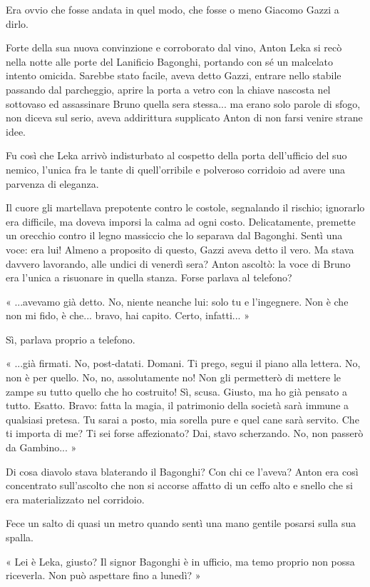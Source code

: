 Era ovvio che fosse andata in quel modo, che fosse o meno Giacomo Gazzi a dirlo.

Forte della sua nuova convinzione e corroborato dal vino, Anton Leka si recò nella notte alle porte del Lanificio Bagonghi, portando con sé un malcelato intento omicida. Sarebbe stato facile, aveva detto Gazzi, entrare nello stabile passando dal parcheggio, aprire la porta a vetro con la chiave nascosta nel sottovaso ed assassinare Bruno quella sera stessa... ma erano solo parole di sfogo, non diceva sul serio, aveva addirittura supplicato Anton di non farsi venire strane idee.

Fu così che Leka arrivò indisturbato al cospetto della porta dell'ufficio del suo nemico, l'unica fra le tante di quell'orribile e polveroso corridoio ad avere una parvenza di eleganza.

Il cuore gli martellava prepotente contro le costole, segnalando il rischio; ignorarlo era difficile, ma doveva imporsi la calma ad ogni costo. Delicatamente, premette un orecchio contro il legno massiccio che lo separava dal Bagonghi. Sentì una voce: era lui! Almeno a proposito di questo, Gazzi aveva detto il vero. Ma stava davvero lavorando, alle undici di venerdì sera? Anton ascoltò: la voce di Bruno era l'unica a risuonare in quella stanza. Forse parlava al telefono?

« ...avevamo già detto. No, niente neanche lui: solo tu e l'ingegnere. Non è che non mi fido, è che... bravo, hai capito. Certo, infatti... »

Sì, parlava proprio a telefono.

« ...già firmati. No, post-datati. Domani. Ti prego, segui il piano alla lettera. No, non è per quello. No, no, assolutamente no! Non gli permetterò di mettere le zampe su tutto quello che ho costruito! Sì, scusa. Giusto, ma ho già pensato a tutto. Esatto. Bravo: fatta la magia, il patrimonio della società sarà immune a qualsiasi pretesa. Tu sarai a posto, mia sorella pure e quel cane sarà servito. Che ti importa di me? Ti sei forse affezionato? Dai, stavo scherzando. No, non passerò da Gambino... »

Di cosa diavolo stava blaterando il Bagonghi? Con chi ce l'aveva? Anton era così concentrato sull'ascolto che non si accorse affatto di un ceffo alto e snello che si era materializzato nel corridoio.

Fece un salto di quasi un metro quando sentì una mano gentile posarsi sulla sua spalla.

« Lei è Leka, giusto? Il signor Bagonghi è in ufficio, ma temo proprio non possa riceverla. Non può aspettare fino a lunedì? »

